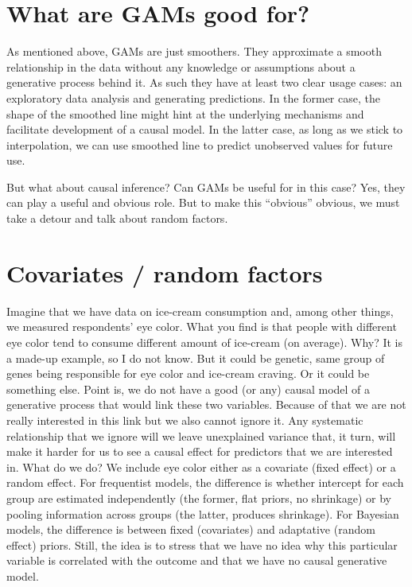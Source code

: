 \documentclass[
]{book}
\begin{document}
\hypertarget{what-are-gams-good-for}{%
\section{What are GAMs good for?}\label{what-are-gams-good-for}}

As mentioned above, GAMs are just smoothers. They approximate a smooth relationship in the data without any knowledge or assumptions about a generative process behind it. As such they have at least two clear usage cases: an exploratory data analysis and generating predictions. In the former case, the shape of the smoothed line might hint at the underlying mechanisms and facilitate development of a causal model. In the latter case, as long as we stick to interpolation, we can use smoothed line to predict unobserved values for future use.

But what about causal inference? Can GAMs be useful for in this case? Yes, they can play a useful and obvious role. But to make this ``obvious'' obvious, we must take a detour and talk about random factors.

\hypertarget{covariates-random-factors}{%
\section{Covariates / random factors}\label{covariates-random-factors}}

Imagine that we have data on ice-cream consumption and, among other things, we measured respondents' eye color. What you find is that people with different eye color tend to consume different amount of ice-cream (on average). Why? It is a made-up example, so I do not know. But it could be genetic, same group of genes being responsible for eye color and ice-cream craving. Or it could be something else. Point is, we do not have a good (or any) causal model of a generative process that would link these two variables. Because of that we are not really interested in this link but we also cannot ignore it. Any systematic relationship that we ignore will we leave unexplained variance that, it turn, will make it harder for us to see a causal effect for predictors that we are interested in. What do we do? We include eye color either as a covariate (fixed effect) or a random effect. For frequentist models, the difference is whether intercept for each group are estimated independently (the former, flat priors, no shrinkage) or by pooling information across groups (the latter, produces shrinkage). For Bayesian models, the difference is between fixed (covariates) and adaptative (random effect) priors. Still, the idea is to stress that we have no idea why this particular variable is correlated with the outcome and that we have no causal generative model.
\end{document}
